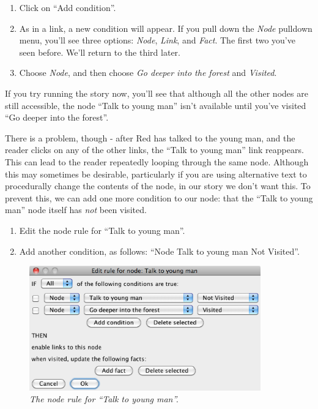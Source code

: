 \documentclass{article}
\begin{document}
\begin{enumerate}
  \item Click on ``Add condition''.
  \item As in a link, a new condition will appear. If you pull down the
  \textit{Node} pulldown menu, you'll see three options: \textit{Node},
  \textit{Link}, and \textit{Fact}. The first two you've seen before. We'll
  return to the third later.
  \item Choose \textit{Node}, and then choose \textit{Go deeper into the
  forest} and \textit{Visited}.
\end{enumerate}

If you try running the story now, you'll see that although all the other nodes
are still accessible, the node ``Talk to young man'' isn't available until
you've visited ``Go deeper into the forest''.

There is a problem, though - after Red has talked to the young man, and the
reader clicks on any of the other links, the ``Talk to young man'' link
reappears. This can lead to the reader repeatedly looping through the same
node. Although this may sometimes be desirable, particularly if you are using
alternative text to procedurally change the contents of the node, in our story
we don't want this. To prevent this, we can add one more condition to our node:
that the ``Talk to young man'' node itself has \textit{not} been visited.

\begin{enumerate}
  \item Edit the node rule for ``Talk to young man''.
  \item Add another condition, as follows: ``Node Talk to young man Not
  Visited''.
\end{enumerate}

\begin{figure}[h]
  \centering
  \includegraphics[width=10cm]{images/hypedyn-tutorial-3-figure-6}
  \caption{\textit{The node rule for ``Talk to young man''.}}
\end{figure} 
\end{document}
